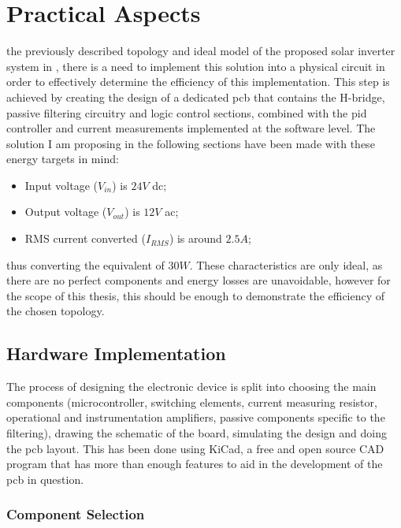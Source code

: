\chapter{Practical Aspects}
\label{chap:practical}

 the previously described topology and ideal model of the proposed solar inverter system in , there is a need to implement this solution into a physical circuit in order to effectively determine the efficiency of this implementation.
This step is achieved by creating the design of a dedicated \gls{pcb} that contains the \gls{H-bridge}, passive filtering circuitry and logic control sections, combined with the \gls{pid} controller and current measurements implemented at the software level.
The solution I am proposing in the following sections have been made with these energy targets in mind:
\begin{itemize}
    \item Input voltage ($V_{in}$) is $24V$ \gls{dc};
    \item Output voltage ($V_{out}$) is $12V$ \gls{ac};
    \item RMS current converted ($I_{RMS}$) is around $2.5A$;
\end{itemize}
thus converting the equivalent of $30W$.
These characteristics are only ideal, as there are no perfect components and energy losses are unavoidable, however for the scope of this thesis, this should be enough to demonstrate the efficiency of the chosen topology.

\section{Hardware Implementation}
\label{sec:hwimp}

The process of designing the electronic device is split into choosing the main components (microcontroller, switching elements, current measuring resistor, operational and instrumentation amplifiers, passive components specific to the filtering), drawing the schematic of the board, simulating the design and doing the \gls{pcb} layout.
This has been done using KiCad, a free and open source CAD program that has more than enough features to aid in the development of the \gls{pcb} in question.

\subsection{Component Selection}
\label{subsec:compsel}

